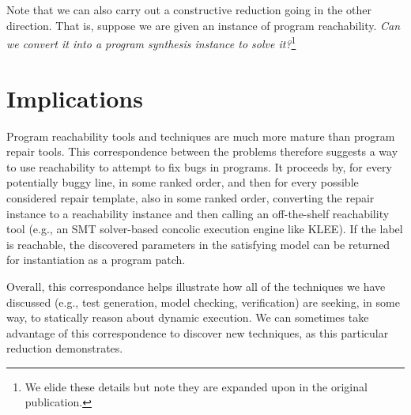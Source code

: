 \documentclass[11pt]{article}
\begin{document}
Note that we can also carry out a constructive reduction going in the other
direction. That is, suppose we are given an instance of program reachability.
\emph{Can we convert it into a program synthesis instance to solve
  it?}\footnote{We elide these details but note they are expanded upon in the
  original publication.}

\section{Implications}

Program reachability tools and techniques are much more mature than program
repair tools. This correspondence between the problems therefore suggests a way
to use reachability to attempt to fix bugs in programs. It proceeds by, for
every potentially buggy line, in some ranked order, and then for every possible
considered repair template, also in some ranked order, converting the repair
instance to a reachability instance and then calling an off-the-shelf
reachability tool (e.g., an SMT solver-based concolic execution engine like
KLEE). If the label is reachable, the discovered parameters in the satisfying
model can be returned for instantiation as a program patch.

Overall, this correspondance helps illustrate how all of the techniques we have
discussed (e.g., test generation, model checking, verification) are seeking, in
some way, to statically reason about dynamic execution. We can sometimes take
advantage of this correspondence to discover new techniques, as this particular
reduction demonstrates.




\end{document}
